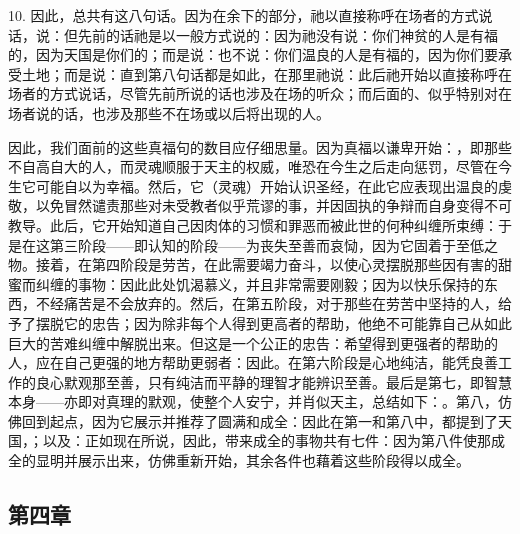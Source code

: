 10. 因此，总共有这八句话。因为在余下的部分，祂以直接称呼在场者的方式说话，说：但先前的话祂是以一般方式说的：因为祂没有说：你们神贫的人是有福的，因为天国是你们的；而是说：也不说：你们温良的人是有福的，因为你们要承受土地；而是说：直到第八句话都是如此，在那里祂说：此后祂开始以直接称呼在场者的方式说话，尽管先前所说的话也涉及在场的听众；而后面的、似乎特别对在场者说的话，也涉及那些不在场或以后将出现的人。\par

因此，我们面前的这些真福句的数目应仔细思量。因为真福以谦卑开始：，即那些不自高自大的人，而灵魂顺服于天主的权威，唯恐在今生之后走向惩罚，尽管在今生它可能自以为幸福。然后，它（灵魂）开始认识圣经，在此它应表现出温良的虔敬，以免冒然谴责那些对未受教者似乎荒谬的事，并因固执的争辩而自身变得不可教导。此后，它开始知道自己因肉体的习惯和罪恶而被此世的何种纠缠所束缚：于是在这第三阶段——即认知的阶段——为丧失至善而哀恸，因为它固着于至低之物。接着，在第四阶段是劳苦，在此需要竭力奋斗，以使心灵摆脱那些因有害的甜蜜而纠缠的事物：因此此处饥渴慕义，并且非常需要刚毅；因为以快乐保持的东西，不经痛苦是不会放弃的。然后，在第五阶段，对于那些在劳苦中坚持的人，给予了摆脱它的忠告；因为除非每个人得到更高者的帮助，他绝不可能靠自己从如此巨大的苦难纠缠中解脱出来。但这是一个公正的忠告：希望得到更强者的帮助的人，应在自己更强的地方帮助更弱者：因此。在第六阶段是心地纯洁，能凭良善工作的良心默观那至善，只有纯洁而平静的理智才能辨识至善。最后是第七，即智慧本身——亦即对真理的默观，使整个人安宁，并肖似天主，总结如下：。第八，仿佛回到起点，因为它展示并推荐了圆满和成全：因此在第一和第八中，都提到了天国，；以及：正如现在所说，因此，带来成全的事物共有七件：因为第八件使那成全的显明并展示出来，仿佛重新开始，其余各件也藉着这些阶段得以成全。\par


\subsection{第四章}

